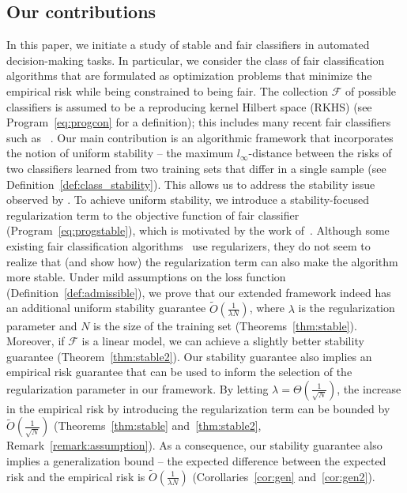 \documentclass[11pt]{article}
\newcommand{\calF}{\mathcal{F}}
\begin{document}
	\subsection{Our contributions}
	\label{subsec:contribution}
	In this paper, we initiate a study of stable and fair classifiers in automated decision-making tasks.
	In particular,	we consider the class of  fair classification algorithms that are formulated as  optimization problems that minimize the empirical risk while being constrained to being fair.
	The collection $\calF$ of possible classifiers is assumed to be a reproducing kernel Hilbert space (RKHS) (see Program~\eqref{eq:progcon} for a definition); this includes many recent fair classifiers such as ~\cite{zafar2017fair,zafar2017fairness,goel2018non}. 
	Our main contribution is an algorithmic framework that incorporates the notion of uniform stability \cite{bousquet2002stability} -- the maximum $l_{\infty}$-distance between the risks of two classifiers learned from two training sets that differ in a single sample (see Definition~\ref{def:class_stability}).
	This allows us to address the stability issue observed by \cite{friedler2018comparative}.
	To achieve uniform stability, we introduce a stability-focused regularization term to the objective function of fair classifier  (Program~\eqref{eq:progstable}), which is motivated by the work of~\cite{bousquet2002stability}.
	Although some existing fair classification algorithms~\cite{kamishima2012fairness,goel2018non} use regularizers, they do not seem to realize that (and show how) the regularization term can also make the algorithm more stable.
	Under mild assumptions on the loss function (Definition~\ref{def:admissible}), we prove that our extended framework indeed has an additional uniform stability guarantee $\tilde{O}(\frac{1}{\lambda N})$, where $\lambda$ is the regularization parameter and $N$ is the size of the training set (Theorems~\ref{thm:stable}).
	Moreover, if $\calF$ is a linear model, we can achieve a slightly better stability guarantee (Theorem~\ref{thm:stable2}).
	Our stability guarantee also implies an empirical risk guarantee that can be used to inform the selection of the regularization parameter in our framework. 
	By letting $\lambda = \Theta(\frac{1}{\sqrt{N}})$, the increase in the empirical risk by introducing the regularization term can be bounded by $\tilde{O}(\frac{1}{\sqrt{N}})$ (Theorems~\ref{thm:stable} and~\ref{thm:stable2}, Remark~\ref{remark:assumption}).
	As a consequence, our stability guarantee also implies a generalization bound -- the expected difference between the expected risk and the empirical risk is $\tilde{O}(\frac{1}{\lambda N})$ (Corollaries~\ref{cor:gen} and~\ref{cor:gen2}).
	
\end{document}

